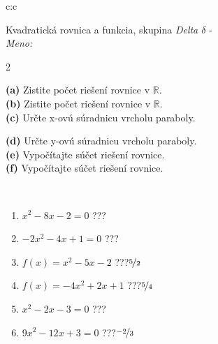 \documentclass[10pt]{report}
\begin{document}
\begin{tabular}{c:c}
\begin{minipage}[c][104.5mm][t]{0.5\linewidth}
\begin{center}
\vspace{7mm}
{\huge {\LARGE Kvadratická rovnica a funkcia}, skupina \textit{Delta $\delta$} -}\\[5mm]
\textit{Meno:}\phantom{xxxxxxxxxxxxxxxxxxxxxxxxxxxxxxxxxxxxxxxxxxxxxxxxxxxxxxxxxxxxxxxxx}\\[5mm]
\begin{minipage}{0.95\linewidth}
\begin{center}
{\small \begin{multicols}{2} \raggedright
\textbf{(a)} Zistite počet riešení rovnice v \(\mathbb{R}\). \\[1mm]
\textbf{(b)} Zistite počet riešení rovnice v \(\mathbb{R}\). \\[1mm]
\textbf{(c)} Určte x-ovú súradnicu vrcholu paraboly. \par \columnbreak
\textbf{(d)} Určte y-ovú súradnicu vrcholu paraboly. \\[1mm]
\textbf{(e)} Vypočítajte súčet riešení rovnice. \\[1mm]
\textbf{(f)} Vypočítajte súčet riešení rovnice.
\end{multicols}
}
\end{center}
\end{minipage}
\\[4mm]
\begin{minipage}{0.79\linewidth}
\begin{center}
\begin{varwidth}{\linewidth}
\begin{enumerate}
\Large
\item $x^2-8x-2=0$\quad \dotfill\; ???\;\dotfill {}
\item $-2x^2-4x+1=0$\quad \dotfill\; ???\;\dotfill {}
\item $f(x)=x^2-5x-2$\quad \dotfill\; ???\;\dotfill \quad $\nicefrac{5}{2}$
\item $f(x)=-4x^2+2x+1$\quad \dotfill\; ???\;\dotfill \quad $\nicefrac{5}{4}$
\item $x^2-2x-3=0$\quad \dotfill\; ???\;\dotfill {}
\item $9x^2-12x+3=0$\quad \dotfill\; ???\;\dotfill \quad $\nicefrac{-2}{3}$
\end{enumerate}
\end{varwidth}
\end{center}

\end{minipage}
\end{center}
\end{minipage}
\end{tabular}
\end{document}
